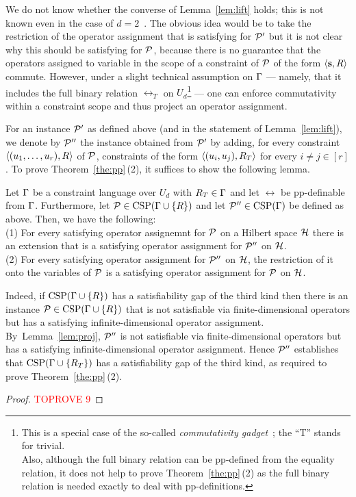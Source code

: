 \documentclass[11pt,letter]{article}
\begin{document}
We do not know whether the converse of Lemma~\ref{lem:lift} holds; this is not known even in the case of $d=2$~\cite{AKS19:jcss}.
The obvious idea would be to take the restriction of the operator assignment
that is satisfying for ${\mathcal P}'$ but it is not clear why this should be satisfying
for ${\mathcal P}$, because there is no guarantee that the operators assigned to variable in the scope of a constraint of ${\mathcal P}$ of the form $\langle {\bf s}, R \rangle$ commute. However, under a slight technical assumption on $\Gamma$ --- namely,
that it includes the full binary relation $\rel_T$ on $U_d$\footnote{This is a special case of the
so-called \emph{commutativity gadget}~\cite{AKS19:jcss}; the ``T'' stands for
trivial.\\ Also, although the full binary relation can be pp-defined from the equality relation, it does not help to prove Theorem~\ref{the:pp}\,(2) as the full binary relation is needed exactly to deal with pp-definitions.} --- one can
enforce commutativity within a constraint scope and thus project an operator
assignment. 

For an instance ${\mathcal P}'$ as defined above (and in the statement of Lemma~\ref{lem:lift}), we denote by ${\mathcal P}''$ the instance obtained from ${\mathcal P}'$ by adding, for every constraint $\langle (u _1,\ldots, u _{r}),R \rangle$ of ${\mathcal P}$, constraints of the form $\langle (u_i,u_j),R_T \rangle$ for every $i\neq j\in [r]$.
To prove Theorem~\ref{the:pp}\,(2), it suffices to show the following lemma.

\begin{lemma}\label{lem:proj}
  Let $\Gamma$ be a constraint language over $U_d$ with $R_T\in\Gamma$ and let $\rel$ be pp-definable
  from $\Gamma$. Furthermore, let ${\mathcal P}\in{\rm CSP}(\Gamma\cup\{R\})$ and let
  ${\mathcal P}''\in{\rm CSP}(\Gamma)$ be defined as above.  Then, we have the following:\\[2mm]
(1) For every satisfying operator assignemnt for ${\mathcal P}$ on a Hilbert
  space ${\mathcal H}$ there is an extension that is a satisfying operator
  assignment for ${\mathcal P}''$ on ${\mathcal H}$.\\[2mm]
(2) For every satisfying operator assignment for ${\mathcal P}''$ on ${\mathcal H}$, the
  restriction of it onto the variables of ${\mathcal P}$ is a satisfying operator
  assignment for ${\mathcal P}$ on ${\mathcal H}$.
\end{lemma}
Indeed, if ${\rm CSP}(\Gamma\cup\{R\})$ has a satisfiability gap of the
third kind then there is an instance ${\mathcal P}\in{\rm CSP}(\Gamma\cup\{R\})$ that is not
satisfiable via finite-dimensional operators but has a satisfying
infinite-dimensional operator assignment. By~Lemma~\ref{lem:proj}, ${\mathcal P}''$ is
not satisfiable via finite-dimensional operators but has a satisfying
infinite-dimensional operator assignment. Hence ${\mathcal P}''$ establishes that
${\rm CSP}(\Gamma\cup\{R_T\})$ has a satisfiability gap of the third kind, as required to prove Theorem~\ref{the:pp}\,(2).
\begin{proof}\textcolor{red}{TOPROVE 9}\end{proof}
\end{document}
